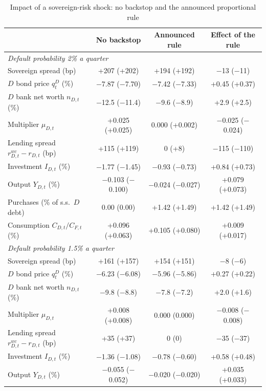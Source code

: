 \begin{table}[htbp]
\centering
\caption{Impact of a sovereign-risk shock: no backstop and the announced proportional rule}
\label{tab:headline-impact}
\small
\begin{tabular}{lccc}
\toprule
 & No backstop & Announced rule & Effect of the rule \\
\midrule
\multicolumn{4}{l}{\emph{Default probability 2\% a quarter}} \\
Sovereign spread (bp) & +207 (+202) & +194 (+192) & $-$13 ($-$11) \\
$D$ bond price $q^D_t$ (\%) & $-$7.87 ($-$7.70) & $-$7.42 ($-$7.33) & +0.45 (+0.37) \\
$D$ bank net worth $n_{D,t}$ (\%) & $-$12.5 ($-$11.4) & $-$9.6 ($-$8.9) & +2.9 (+2.5) \\
Multiplier $\mu_{D,t}$ & +0.025 (+0.025) & 0.000 (+0.002) & $-$0.025 ($-$0.024) \\
Lending spread $r^{wc}_{D,t}-r_{D,t}$ (bp) & +115 (+119) & 0 (+8) & $-$115 ($-$110) \\
Investment $I_{D,t}$ (\%) & $-$1.77 ($-$1.45) & $-$0.93 ($-$0.73) & +0.84 (+0.73) \\
Output $Y_{D,t}$ (\%) & $-$0.103 ($-$0.100) & $-$0.024 ($-$0.027) & +0.079 (+0.073) \\
Purchases (\% of s.s.\ $D$ debt) & 0.00 (0.00) & +1.42 (+1.49) & +1.42 (+1.49) \\
Consumption $C_{D,t}/C_{F,t}$ (\%) & +0.096 (+0.063) & +0.105 (+0.080) & +0.009 (+0.017) \\
\midrule
\multicolumn{4}{l}{\emph{Default probability 1.5\% a quarter}} \\
Sovereign spread (bp) & +161 (+157) & +154 (+151) & $-$8 ($-$6) \\
$D$ bond price $q^D_t$ (\%) & $-$6.23 ($-$6.08) & $-$5.96 ($-$5.86) & +0.27 (+0.22) \\
$D$ bank net worth $n_{D,t}$ (\%) & $-$9.8 ($-$8.8) & $-$7.8 ($-$7.2) & +2.0 (+1.6) \\
Multiplier $\mu_{D,t}$ & +0.008 (+0.008) & 0.000 (0.000) & $-$0.008 ($-$0.008) \\
Lending spread $r^{wc}_{D,t}-r_{D,t}$ (bp) & +35 (+37) & 0 (0) & $-$35 ($-$37) \\
Investment $I_{D,t}$ (\%) & $-$1.36 ($-$1.08) & $-$0.78 ($-$0.60) & +0.58 (+0.48) \\
Output $Y_{D,t}$ (\%) & $-$0.055 ($-$0.052) & $-$0.020 ($-$0.020) & +0.035 (+0.033) \\

\end{tabular}
\end{table}
